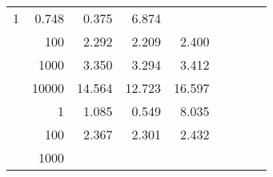 \begin{table}
\begin{tabular}{rrrrrrrrr}
					\multirow{ 1 }{*}{ 1 } &
					
						
							    
							    
	                           0.748 & 0.375 & 6.874  \\
	                
	            
					 &  
					 
					\multirow{ 1 }{*}{ 100 } &
					
						
							    
							    
	                           2.292 & 2.209 & 2.400  \\
	                
	            
					 &  
					 
					\multirow{ 1 }{*}{ 1000 } &
					
						
							    
							    
	                           3.350 & 3.294 & 3.412  \\
	                
	            
					 &  
					 
					\multirow{ 1 }{*}{ 10000 } &
					
						
							    
							    
	                           14.564 & 12.723 & 16.597  \\
	                
	            
	        
				\noalign{\smallskip}\hline
				\multirow{ 4 }{*}{ 160000 } &
				
					
					 
					\multirow{ 1 }{*}{ 1 } &
					
						
							    
							    
	                           1.085 & 0.549 & 8.035  \\
	                
	            
					 &  
					 
					\multirow{ 1 }{*}{ 100 } &
					
						
							    
							    
	                           2.367 & 2.301 & 2.432  \\
	                
	            
					 &  
					 
					\multirow{ 1 }{*}{ 1000 } &
					
						
							    

\end{tabular}
\end{table}
